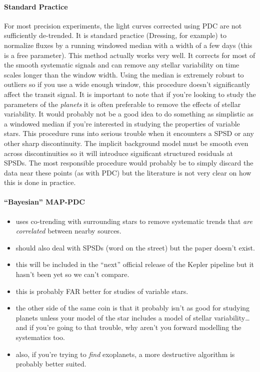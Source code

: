 \documentclass[letterpaper,12pt,preprint]{hack_aastex}
\begin{document}
\paragraph{Standard Practice}
For most precision experiments, the light curves corrected using PDC are not
sufficiently de-trended.
It is standard practice (Dressing, for example) to normalize fluxes by a
running windowed median with a width of a few days (this is a free parameter).
This method actually works very well.
It corrects for most of the smooth systematic signals and can remove any
stellar variability on time scales longer than the window width.
Using the median is extremely robust to outliers so if you use a wide enough
window, this procedure doesn't significantly affect the transit signal.
It is important to note that if you're looking to study the parameters of the
\emph{planets} it is often preferable to remove the effects of stellar
variability.
It would probably not be a good idea to do something as simplistic as a
windowed median if you're interested in studying the properties of variable
stars.
This procedure runs into serious trouble when it encounters a SPSD or any
other sharp discontinuity.
The implicit background model must be smooth even across discontinuities so it
will introduce significant structured residuals at SPSDs.
The most responsible procedure would probably be to simply discard the data
near these points (as with PDC) but the literature is not very clear on how
this is done in practice.


\paragraph{``Bayesian'' MAP-PDC}
\begin{itemize}
\item uses co-trending with surrounding stars to remove systematic trends that
\emph{are correlated} between nearby sources.
\item should also deal with SPSDs (word on the street) but the paper doesn't
exist.
\item this will be included in the ``next'' official release of the Kepler
pipeline but it hasn't been yet so we can't compare.
\item this is probably FAR better for studies of variable stars.
\item the other side of the same coin is that it probably isn't as good for
studying planets unless your model of the star includes a model of stellar
variability\ldots and if you're going to that trouble, why aren't you forward
modelling the systematics too.
\item also, if you're trying to \emph{find} exoplanets, a more destructive
algorithm is probably better suited.
\end{itemize}
\end{document}
